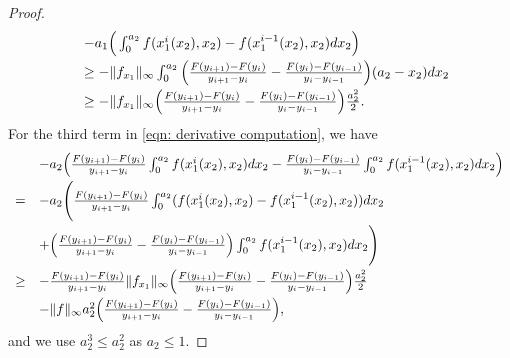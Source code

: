 \documentclass[10pt,a4paper]{amsart}
\begin{document}
\begin{proof}
\[
        \begin{array}{ll}
        &-a_1\Big(\int_0^{a_2}f(x_1^{i}(x_2),x_2)-f(x_1^{i-1}(x_2),x_2)dx_2\Big)\vspace{3pt}\\
        &\ge - \|f_{x_1}\|_\infty\int_0^{a_2}\Big(\frac{F(y_{i+1})-F(y_i)}{y_{i+1}-y_i}-\frac{F(y_{i})-F(y_{i-1})}{y_{i}-y_{i-1}}\Big)(a_2-x_2)dx_2\vspace{3pt}\\
        &\ge-\|f_{x_1}\|_\infty\Big(\frac{F(y_{i+1})-F(y_i)}{y_{i+1}-y_i}-\frac{F(y_{i})-F(y_{i-1})}{y_{i}-y_{i-1}}\Big)\frac{a_2^2}{2}.
        \end{array}\]
For the third term in \eqref{eqn: derivative computation}, we have 
\[\begin{array}{ll}
          &-a_2\Big(\frac{F(y_{i+1})-F(y_i)}{y_{i+1}-y_i}\int_0^{a_2}f(x_1^{i}(x_2),x_2)dx_2-\frac{F(y_i)-F(y_{i-1})}{y_i-y_{i-1}}\int_0^{a_2}f(x_1^{i-1}(x_2),x_2)dx_2\Big)\vspace{3pt}\\
        =&-a_2\Bigg(\frac{F(y_{i+1})-F(y_i)}{y_{i+1}-y_i}\int_0^{a_2}(f(x_1^{i}(x_2),x_2)-f(x_1^{i-1}(x_2),x_2))dx_2\vspace{3pt}\\
        &+\Big(\frac{F(y_{i+1})-F(y_i)}{y_{i+1}-y_i}-\frac{F(y_i)-F(y_{i-1})}{y_i-y_{i-1}}\Big)\int_0^{a_2}f(x_1^{i-1}(x_2),x_2)dx_2\Bigg)\vspace{3pt}\\
        \ge&- \frac{F(y_{i+1})-F(y_i)}{y_{i+1}-y_i}\|f_{x_1}\|_\infty\Big(\frac{F(y_{i+1})-F(y_i)}{y_{i+1}-y_i}-\frac{F(y_{i})-F(y_{i-1})}{y_{i}-y_{i-1}}\Big)\frac{a_2^2}{2}\vspace{3pt}\\
        &-\|f\|_\infty a_2^2\Big(\frac{F(y_{i+1})-F(y_i)}{y_{i+1}-y_i}
        -\frac{F(y_i)-F(y_{i-1})}{y_i-y_{i-1}}\Big),
        \end{array}\]
and we use $a_2^3\le a_2^2$ as $a_2\le1.$


\end{proof}
\end{document}

